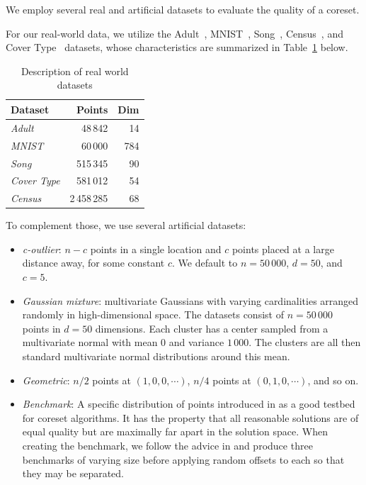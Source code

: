 We employ several real and artificial datasets to evaluate the quality of a coreset. 

For our real-world data, we utilize the Adult~\cite{Dua:2019}, MNIST~\cite{mnist}, Song~\cite{song}, Census~\cite{census}, and Cover Type~\cite{covtype}
datasets, whose characteristics are summarized in Table~\cref{tbl:datasets} below.

\begin{table}[htbp]
    \label{tbl:datasets}
    \centering
    \begin{tabular}{lrr}
        Dataset & Points & Dim \\
        \hline
        \emph{Adult} & 48\,842 & 14 \\
        \emph{MNIST} & 60\,000 & 784 \\
        \emph{Song} & 515\,345 & 90 \\
        \emph{Cover Type} & 581\,012 & 54 \\
        \emph{Census} & 2\,458\,285 & 68
    \end{tabular}
    \caption{Description of real world datasets}
\end{table}

To complement those, we use several artificial datasets:
\begin{itemize}
    \item \emph{c-outlier}: $n-c$ points in a single location and $c$ points placed at a large distance away, for some constant $c$. We default to $n=50\,000$,
        $d=50$, and $c=5$.
    \item \emph{Gaussian mixture}: multivariate Gaussians with varying cardinalities arranged randomly in high-dimensional space. 
        The datasets consist of $n=50\,000$ points in $d=50$ dimensions. Each cluster has a center sampled from a multivariate normal with mean $0$ and
        variance $1\,000$. The clusters are all then standard multivariate normal distributions around this mean.
    \item \emph{Geometric}: $n/2$ points at $(1, 0, 0, \cdots)$, $n/4$ points at $(0, 1, 0, \cdots)$, and so on.
    \item \emph{Benchmark}: A specific distribution of points introduced in \cite{chrisESA} as a good testbed for coreset algorithms. 
    It has the property that all reasonable solutions are of equal quality but are maximally far apart in the solution space. When creating the benchmark, we
    follow the advice in \cite{chrisESA} and produce three benchmarks of varying size before applying random offsets to each so that they may be separated.
\end{itemize}

